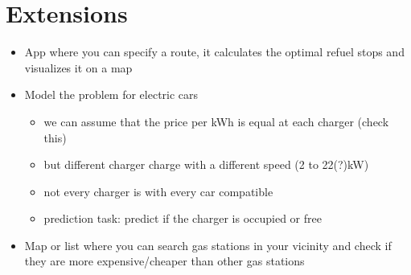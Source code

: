 \documentclass[%
a4paper,
DIV12,
2.5headlines,
bigheadings,
titlepage,
openbib,
]{scrartcl}
\begin{document}
\section{Extensions}\label{extensions}
\begin{itemize}
\item App where you can specify a route, it calculates the optimal refuel stops and visualizes it on a map
\item Model the problem for electric cars

\begin{itemize}
\item we can assume that the price per kWh is equal at each charger (check this)\\
\item but different charger charge with a different speed (2 to 22(?)kW)\\
\item not every charger is with every car compatible\\
\item prediction task: predict if the charger is occupied or free\\
\end{itemize}

\item Map or list where you can search gas stations in your vicinity and check if they are more expensive/cheaper than other gas stations
\end{itemize}


 
\end{document}
